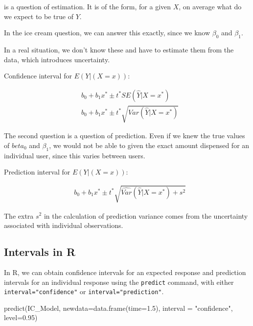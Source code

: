 \documentclass[
  letterpaper,
  DIV=11,
  numbers=noendperiod]{scrreprt}
\newenvironment{Shaded}{\begin{snugshade}}{\end{snugshade}}
\newcommand{\AttributeTok}[1]{\textcolor[rgb]{0.40,0.45,0.13}{#1}}
\newcommand{\FloatTok}[1]{\textcolor[rgb]{0.68,0.00,0.00}{#1}}
\newcommand{\FunctionTok}[1]{\textcolor[rgb]{0.28,0.35,0.67}{#1}}
\newcommand{\NormalTok}[1]{\textcolor[rgb]{0.00,0.23,0.31}{#1}}
\newcommand{\StringTok}[1]{\textcolor[rgb]{0.13,0.47,0.30}{#1}}
\begin{document}
is a question of estimation. It is of the form, for a given \(X\), on
average what do we expect to be true of \(Y\).

In the ice cream question, we can answer this exactly, since we know
\(\beta_0\) and \(\beta_1\).

In a real situation, we don't know these and have to estimate them from
the data, which introduces uncertainty.

Confidence interval for \(E(Y | (X=x))\):

\[
\begin{aligned}
& b_0+b_1x^* \pm t^*SE(\hat{Y}|X=x^*) \\
& b_0+b_1x^* \pm t^*\sqrt{\widehat{Var}(\hat{Y}|X=x^*)}
\end{aligned}
\]

The second question is a question of prediction. Even if we knew the
true values of \(beta_0\) and \(\beta_1\), we would not be able to given
the exact amount dispensed for an individual user, since this varies
between users.

Prediction interval for \(E(Y | (X=x))\):

\[
\begin{aligned}
& b_0+b_1x^* \pm t^*\sqrt{\widehat{Var}(\hat{Y}|X=x^*) + s^2} 
\end{aligned}
\]

The extra \(s^2\) in the calculation of prediction variance comes from
the uncertainty associated with individual observations.

\subsection{Intervals in R}\label{intervals-in-r}

In R, we can obtain confidence intervals for an expected response and
prediction intervals for an individual response using the
\texttt{predict} command, with either \texttt{interval="confidence"} or
\texttt{interval="prediction"}.

\begin{Shaded}
\begin{Highlighting}[]
\FunctionTok{predict}\NormalTok{(IC\_Model, }\AttributeTok{newdata=}\FunctionTok{data.frame}\NormalTok{(}\AttributeTok{time=}\FloatTok{1.5}\NormalTok{), }\AttributeTok{interval =} \StringTok{"confidence"}\NormalTok{, }\AttributeTok{level=}\FloatTok{0.95}\NormalTok{)}
\end{Highlighting}
\end{Shaded}
\end{document}
